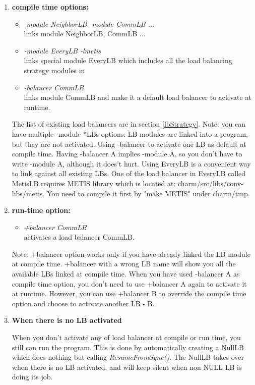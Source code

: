 \begin{enumerate}
\item {\bf compile time options:}

\begin{itemize}
\item {\em -module NeighborLB -module CommLB ...}  \\
  links module NeighborLB, CommLB ...
\item {\em -module EveryLB -lmetis} \\
  links special module EveryLB which includes all the load balancing strategy modules in \charmpp{}
\item {\em -balancer CommLB} \\
  links module CommLB and make it a default load balancer to activate at runtime.
\end{itemize}

The list of existing load balancers are in section \ref{lbStrategy}.
Note: you can have multiple -module *LBs options. LB modules are
linked into a program, but they are not activated.
Using -balancer to activate one LB as default at compile time. Having -balancer A implies -module A, so you don't have to write -module A, although it does't hurt.
Using EveryLB is a convenient way to link against all existing LBs. 
One of the load balancer in EveryLB called MetisLB requires METIS library 
which is located at: charm/src/libs/conv-libs/metis. 
You need to compile it first by "make METIS" under charm/tmp.

\item {\bf run-time option:}

\begin{itemize}
\item {\em +balancer CommLB} \\
  activates a load balancer CommLB.
\end{itemize}

Note: +balancer option works only if you have already linked the LB module 
at compile time. +balancer with a 
wrong LB name will show you all the available LBs linked at compile time.
When you have used -balancer A as compile time option, you don't need to use 
+balancer A again to activate it at runtime. However, you can 
use +balancer B to override the compile time option and choose to
activate another LB - B.

\item {\bf When there is no LB activated}

When you don't activate any of load balancer at compile or run time, you still 
can run the program. This is done by automatically creating a NullLB which 
does nothing but calling {\em ResumeFromSync()}. 
The NullLB takes over when there is no LB activated, and will keep silent 
when non NULL LB is doing its job. 

\end{enumerate}


